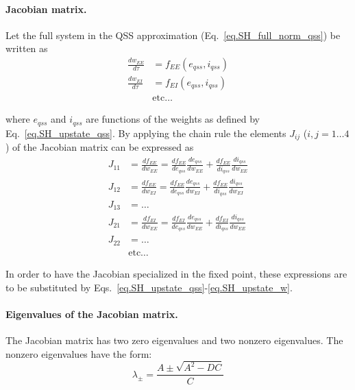 \documentclass[twocolumn]{article}
\newcommand{\EE}{\mathit{EE}}
\newcommand{\EI}{\mathit{EI}}
\newcommand{\qss}{\mathit{qss}}
\begin{document}
\paragraph{Jacobian matrix.}

Let the full system in the QSS approximation (Eq.\ \ref{eq.SH_full_norm_qss}) be written as
\begin{displaymath}
\begin{aligned}
\frac{dw_{\EE}}{d\tau} & = f_{\EE}(e_{\qss},i_{\qss}) \\
\frac{dw_{\EI}}{d\tau} & = f_{\EI}(e_{\qss},i_{\qss}) \\
& \mbox{etc}\ldots
\end{aligned}
\end{displaymath}

\noindent where $e_{\qss}$ and $i_{\qss}$ are functions of the weights as defined by Eq.\ \ref{eq.SH_upstate_qss}. By applying the chain rule the elements $J_{ij}$ ($i,j=1\ldots4$) of the Jacobian matrix can be expressed as
\begin{displaymath}
\begin{aligned}
J_{11} & = \frac{df_{\EE}}{dw_{\EE}} = \frac{df_{\EE}}{de_{\qss}} \frac{de_{\qss}}{dw_{\EE}} + \frac{df_{\EE}}{di_{\qss}} \frac{di_{\qss}}{dw_{\EE}} \\
J_{12} & = \frac{df_{\EE}}{dw_{\EI}} = \frac{df_{\EE}}{de_{\qss}} \frac{de_{\qss}}{dw_{\EI}} + \frac{df_{\EE}}{di_{\qss}} \frac{di_{\qss}}{dw_{\EI}} \\
J_{13} & = \ldots \\
J_{21} & = \frac{df_{\EI}}{dw_{\EE}} = \frac{df_{\EI}}{de_{\qss}} \frac{de_{\qss}}{dw_{\EE}} + \frac{df_{\EI}}{di_{\qss}} \frac{di_{\qss}}{dw_{\EE}} \\
J_{22} & = \ldots \\
& \mbox{etc}\ldots
\end{aligned}
\end{displaymath}

In order to have the Jacobian specialized in the fixed point, these expressions are to be substituted by Eqs.\ \ref{eq.SH_upstate_qss}-\ref{eq.SH_upstate_w}.



\paragraph{Eigenvalues of the Jacobian matrix.}

The Jacobian matrix has two zero eigenvalues and two nonzero eigenvalues. The nonzero eigenvalues have the form:
\begin{equation}
\lambda_{\pm} = \frac{A \pm \sqrt{A^2 - DC}}{C}
\label{eq.SH_eigvals}
\end{equation}
\end{document}
